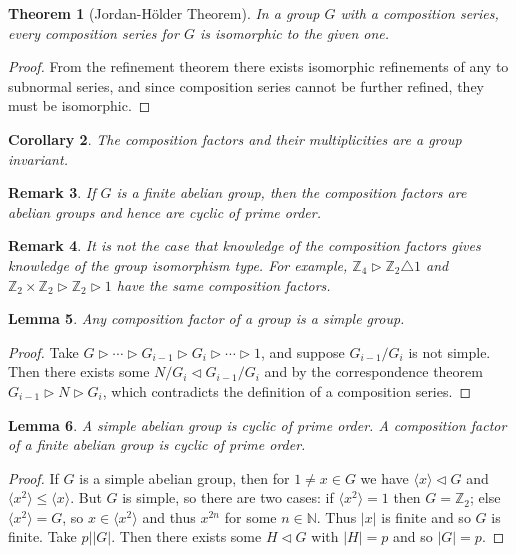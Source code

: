 \documentclass[a4paper,10pt]{article}
\newcommand{\NN}{\mathbb{N}}
\newcommand{\ZZ}{\mathbb{Z}}
\newtheorem{thm}{Theorem}
\newtheorem{Cor}[thm]{Corollary}
\newtheorem{Lem}[thm]{Lemma}
\newtheorem{rem}[thm]{Remark}
\begin{document}
\begin{thm}[Jordan-H\"{o}lder Theorem]
In a group $G$ with a composition series, every composition series for $G$ is isomorphic to the given one.
\end{thm}
\begin{proof}
From the refinement theorem there exists isomorphic refinements of any to subnormal series, and since composition series cannot be further refined, they must be isomorphic.
\end{proof}

\begin{Cor}
The composition factors and their multiplicities are a group invariant. 
\end{Cor}

\begin{rem}
If $G$ is a finite abelian group, then the composition factors are abelian groups and hence are cyclic of prime order.
\end{rem}

\begin{rem}
It is not the case that knowledge of the composition factors gives knowledge of the group isomorphism type. For example, $\ZZ_4 \triangleright \ZZ_2 \triangle 1$ and $\ZZ_2 \times \ZZ_2 \triangleright \ZZ_2 \triangleright 1$ have the same composition factors.
\end{rem}


\begin{Lem}
Any composition factor of a group is a simple group. 
\end{Lem}
\begin{proof}
Take $G \triangleright \cdots \triangleright G_{i-1} \triangleright G_i \triangleright \cdots \triangleright 1$, and suppose $G_{i-1} / G_i$ is not simple. Then there exists some $N / G_{i} \triangleleft G_{i-1} / G_i$ and by the correspondence theorem $G_{i-1} \triangleright N \triangleright G_i$, which contradicts the definition of a composition series.
\end{proof}

\begin{Lem}
A simple abelian group is cyclic of prime order. A composition factor of a finite abelian group is cyclic of prime order.
\end{Lem}

\begin{proof}
If $G$ is a simple abelian group, then for $1 \neq x \in G$ we have $\langle x \rangle \triangleleft G$ and $\langle x^2 \rangle \leq \langle x \rangle$. But $G$ is simple, so there are two cases: if $\langle x^2 \rangle  = 1$ then $G = \ZZ_2$; else $\langle x^2 \rangle = G$, so $x \in \langle x^2 \rangle$ and thus $x^{2n}$ for some $n \in \NN$. Thus $|x|$ is finite and so $G$ is finite. Take $p | |G|$. Then there exists some $H \triangleleft G$ with $|H| = p$ and so $|G| = p$.
\end{proof}
\end{document}
